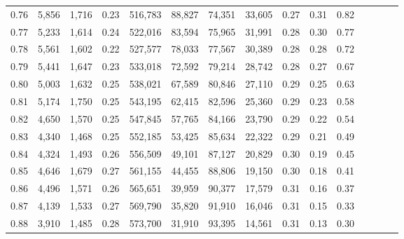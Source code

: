 \begin{tabular}{rrrcrrrrrrrrrrr}
0.76 &   5,856 &  1,716 &                                       0.23 &  516,783 &   88,827 &   74,351 &   33,605 &  0.27 &  0.31 &                         0.82 \\
0.77 &   5,233 &  1,614 &                                       0.24 &  522,016 &   83,594 &   75,965 &   31,991 &  0.28 &  0.30 &                         0.77 \\
0.78 &   5,561 &  1,602 &                                       0.22 &  527,577 &   78,033 &   77,567 &   30,389 &  0.28 &  0.28 &                         0.72 \\
0.79 &   5,441 &  1,647 &                                       0.23 &  533,018 &   72,592 &   79,214 &   28,742 &  0.28 &  0.27 &                         0.67 \\
0.80 &   5,003 &  1,632 &                                       0.25 &  538,021 &   67,589 &   80,846 &   27,110 &  0.29 &  0.25 &                         0.63 \\
0.81 &   5,174 &  1,750 &                                       0.25 &  543,195 &   62,415 &   82,596 &   25,360 &  0.29 &  0.23 &                         0.58 \\
0.82 &   4,650 &  1,570 &                                       0.25 &  547,845 &   57,765 &   84,166 &   23,790 &  0.29 &  0.22 &                         0.54 \\
0.83 &   4,340 &  1,468 &                                       0.25 &  552,185 &   53,425 &   85,634 &   22,322 &  0.29 &  0.21 &                         0.49 \\
0.84 &   4,324 &  1,493 &                                       0.26 &  556,509 &   49,101 &   87,127 &   20,829 &  0.30 &  0.19 &                         0.45 \\
0.85 &   4,646 &  1,679 &                                       0.27 &  561,155 &   44,455 &   88,806 &   19,150 &  0.30 &  0.18 &                         0.41 \\
0.86 &   4,496 &  1,571 &                                       0.26 &  565,651 &   39,959 &   90,377 &   17,579 &  0.31 &  0.16 &                         0.37 \\
0.87 &   4,139 &  1,533 &                                       0.27 &  569,790 &   35,820 &   91,910 &   16,046 &  0.31 &  0.15 &                         0.33 \\
0.88 &   3,910 &  1,485 &                                       0.28 &  573,700 &   31,910 &   93,395 &   14,561 &  0.31 &  0.13 &                         0.30 \\

\end{tabular}
